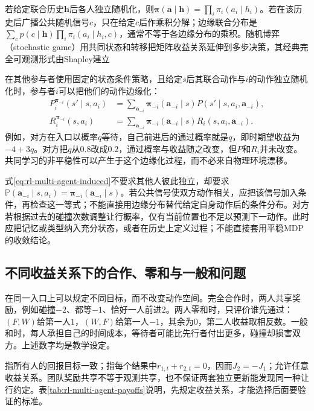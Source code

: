 若给定联合历史$\bm h$后各人独立随机化，则$\bm\pi(\bm a\mid\bm h)=\prod_i\pi_i(a_i\mid h_i)$。若在该历史后广播公共随机信号$c$，只在给定$c$后作乘积分解；边缘联合分布是$\sum_c p(c\mid\bm h)\prod_i\pi_i(a_i\mid h_i,c)$，通常不等于各边缘分布的乘积。随机博弈（stochastic game）用共同状态和转移把矩阵收益关系延伸到多步决策，其经典完全可观测形式由Shapley建立

在其他参与者使用固定的状态条件策略，且给定$s$后其联合动作与$i$的动作独立随机化时，参与者$i$可以把他们的动作边缘化：
\begin{align}
 P_i^{\bm\pi_{-i}}(s'\mid s,a_i)
 &=\sum_{\bm a_{-i}}\bm\pi_{-i}(\bm a_{-i}\mid s)
 P(s'\mid s,a_i,\bm a_{-i}),\label{eq:rl-multi-agent-induced}\\
 R_i^{\bm\pi_{-i}}(s,a_i)
 &=\sum_{\bm a_{-i}}\bm\pi_{-i}(\bm a_{-i}\mid s)
 R_i(s,a_i,\bm a_{-i}).\nonumber
\end{align}
例如，对方在入口以概率$q$等待，自己前进后的通过概率就是$q$，即时期望收益为$-4+3q$。对方把$q$从$0.8$改成$0.2$，通过概率与收益随之改变，但$P$和$R_i$并未改变。共同学习的非平稳性可以产生于这个边缘化过程，而不必来自物理环境漂移。

式\eqref{eq:rl-multi-agent-induced}不要求其他人彼此独立，却要求$\mathbb P(\bm a_{-i}\mid s,a_i)=\bm\pi_{-i}(\bm a_{-i}\mid s)$。若公共信号使双方动作相关，应把该信号加入条件，再检查这一等式；不能直接用边缘分布替代给定自身动作后的条件分布。对方若根据过去的碰撞次数调整让行概率，仅有当前位置也不足以预测下一动作。此时应把记忆或类型纳入充分状态，或者在历史上定义过程；不能直接套用平稳MDP的收敛结论。

\subsection{不同收益关系下的合作、零和与一般和问题}
\label{sec:rl-multi-agent-payoffs}

在同一入口上可以规定不同目标，而不改变动作空间。完全合作时，两人共享奖励，例如碰撞$-2$、都等$-1$、恰好一人前进$2$。两人零和时，只评价谁先通过：$(F,W)$给第一人$1$，$(W,F)$给第一人$-1$，其余为$0$，第二人收益取相反数。一般和时，每人承担自己的时间成本，等待者可能比先行者付出更多，碰撞却损害双方。上述数字均是教学设定。

指所有人的回报目标一致；指每个结果中$r_{1,t}+r_{2,t}=0$，因而$J_2=-J_1$；允许任意收益关系。团队奖励共享不等于观测共享，也不保证两套独立更新能发现同一种让行约定。表\ref{tab:rl-multi-agent-payoffs}说明，先规定收益关系，才能选择后面要验证的标准。

